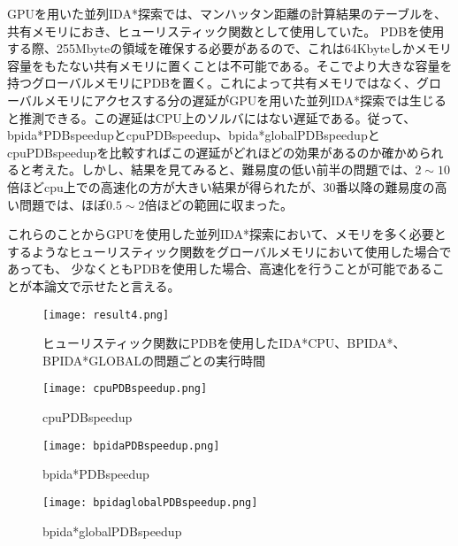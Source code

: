 \documentclass[a4paper,11pt,oneside,openany]{jsbook}
\begin{document}
GPUを用いた並列IDA*探索では、マンハッタン距離の計算結果のテーブルを、共有メモリにおき、ヒューリスティック関数として使用していた。
PDBを使用する際、255Mbyteの領域を確保する必要があるので、これは64Kbyteしかメモリ容量をもたない共有メモリに置くことは不可能である。そこでより大きな容量を持つグローバルメモリにPDBを置く。これによって共有メモリではなく、グローバルメモリにアクセスする分の遅延がGPUを用いた並列IDA*探索では生じると推測できる。この遅延はCPU上のソルバにはない遅延である。従って、bpida*PDBspeedupとcpuPDBspeedup、bpida*globalPDBspeedupとcpuPDBspeedupを比較すればこの遅延がどれほどの効果があるのか確かめられると考えた。しかし、結果を見てみると、難易度の低い前半の問題では、$2\sim10$倍ほどcpu上での高速化の方が大きい結果が得られたが、30番以降の難易度の高い問題では、ほぼ$0.5\sim2$倍ほどの範囲に収まった。

これらのことからGPUを使用した並列IDA*探索において、メモリを多く必要とするようなヒューリスティック関数をグローバルメモリにおいて使用した場合であっても、
少なくともPDBを使用した場合、高速化を行うことが可能であることが本論文で示せたと言える。

\begin{figure}[H]
\begin{center}
\texttt{[image: result4.png]}
\caption{ヒューリスティック関数にPDBを使用したIDA*CPU、BPIDA*、BPIDA*GLOBALの問題ごとの実行時間}
\end{center}
\end{figure}

\begin{figure}[H]
\begin{center}
\texttt{[image: cpuPDBspeedup.png]}
\caption{cpuPDBspeedup}
\end{center}
\end{figure}

\begin{figure}[H]
\begin{center}
\texttt{[image: bpidaPDBspeedup.png]}
\caption{bpida*PDBspeedup}
\end{center}
\end{figure}

\begin{figure}[H]
\begin{center}
\texttt{[image: bpidaglobalPDBspeedup.png]}
\caption{bpida*globalPDBspeedup}
\end{center}
\end{figure}
\end{document}
